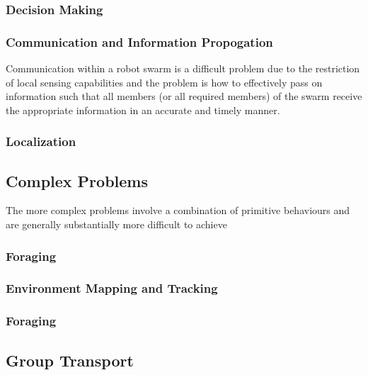 \subsubsection{Decision Making}

\subsubsection{Communication and Information Propogation}
Communication within a robot swarm is a difficult problem due to the restriction of local sensing capabilities and the problem is how to effectively pass on information such that all members (or all required members) of the swarm receive the appropriate information in an accurate and timely manner.

\subsubsection{Localization}

\subsection{Complex Problems}
The more complex problems involve a combination of primitive behaviours and are generally substantially more difficult to achieve


\subsubsection{Foraging}
\subsubsection{Environment Mapping and Tracking}



\subsubsection{Foraging}
\subsection{Group Transport}

